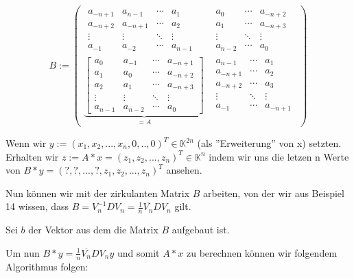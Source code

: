 \documentclass[]{article}
\begin{document}
\[
B := 
\begin{pmatrix}
	\begin{matrix}
		a_{-n+1} & a_{n-1}  & \cdots & a_{1}   \\
		a_{-n+2} & a_{-n+1} & \cdots & a_{2}   \\
		\vdots   & \vdots   & \ddots & \vdots  \\
		a_{-1}   & a_{-2}   & \cdots & a_{n-1} 
	\end{matrix} &
	\begin{matrix}
		a_{0}   & \cdots & a_{-n+2} \\
		a_{1}   & \cdots & a_{-n+3} \\
		\vdots  & \ddots & \vdots   \\
		a_{n-2} & \cdots & a_{0} 
	\end{matrix} \\

	\underbrace{
		\begin{bmatrix}
			a_{0}   & a_{-1}  & \cdots & a_{-n+1}  \\
			a_{1}   & a_{0}   & \cdots & a_{-n+2}  \\
			a_{2}   & a_{1}   & \cdots & a_{-n+3}  \\
			\vdots  & \vdots  & \ddots & \vdots    \\
			a_{n-1} & a_{n-2} & \cdots & a_{0} 
		\end{bmatrix}
	}_{=A}
	 &
	\begin{matrix}
		a_{n-1}  & \cdots & a_{1}    \\
		a_{-n+1} & \cdots & a_{2}    \\
		a_{-n+2} & \cdots & a_{3}    \\
		\vdots   & \ddots & \vdots   \\
		a_{-1}   & \cdots & a_{-n+1} 
	\end{matrix}
\end{pmatrix}
\]

Wenn wir $y:=(x_1, x_2, ..., x_n, 0, .., 0)^T \in \mathbb{K}^{2n}$ (als ''Erweiterung'' von x) setzten. Erhalten wir $z:=A*x = (z_1, z_2, ..., z_n)^T \in \mathbb{K}^n$ indem wir uns die letzen n Werte von $B*y=(?, ?, ..., ?, z_1, z_2, ..., z_n)^T$ ansehen.

Nun können wir mit der zirkulanten Matrix $B$ arbeiten, von der wir aus Beispiel 14 wissen, dass $B=V_n^{-1}DV_n=\frac{1}{n}\overline{V_n}DV_n$ gilt.

Sei $b$ der Vektor aus dem die Matrix $B$ aufgebaut ist.

Um nun $B*y=\frac{1}{n}\overline{V_n}DV_ny$ und somit $A*x$ zu berechnen können wir folgendem Algorithmus folgen:
\end{document}
